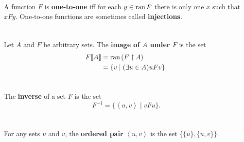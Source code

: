 \documentclass{report}
\begin{document}
A function $F$ is \textbf{one-to-one} iff for each $y \in \mathop{\text{ran}}{F}$ there is only
  one $x$ such that $xFy$.
One-to-one functions are sometimes called \textbf{injections}.

\begin{definition}

  \statementpadding




\end{definition}

\section{}%
\label{ref:image}

Let $A$ and $F$ be arbitrary sets.
The \textbf{image of $A$ under $F$} is the set
  \begin{align*}
    F\!\left\llbracket A\right\rrbracket
      & = \mathop{\text{ran}}{(F \restriction A)} \\
      & = \{v \mid (\exists u \in A) uFv\}.
  \end{align*}

\begin{definition}


\end{definition}

\section{}%
\label{ref:inverse}

The \textbf{inverse} of a set $F$ is the set
  $$F^{-1} = \{\left< u, v \right> \mid vFu\}.$$

\begin{definition}


\end{definition}

\section{}%
\label{ref:ordered-pair}

For any sets $u$ and $v$, the \textbf{ordered pair} $\left< u, v \right>$ is
  the set $\{\{u\}, \{u, v\}\}$.
\end{document}
